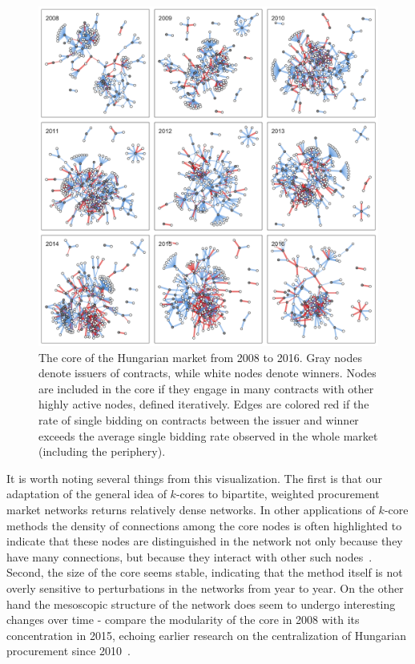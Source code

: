 \begin{figure}
\centering
  \includegraphics[width=\textwidth]{images/ted_networks/hu_core.pdf}
  \caption[Hungarian Market Cores]{The core of the Hungarian market from 2008 to 2016. Gray nodes denote issuers of contracts, while white nodes denote winners. Nodes are included in the core if they engage in many contracts with other highly active nodes, defined iteratively. Edges are colored red if the rate of single bidding on contracts between the issuer and winner exceeds the average single bidding rate observed in the whole market (including the periphery).}
  \label{fig:hu_core}
\end{figure}

It is worth noting several things from this visualization. The first is that our adaptation of the general idea of $k$-cores to bipartite, weighted procurement market networks returns relatively dense networks. In other applications of $k$-core methods the density of connections among the core nodes is often highlighted to indicate that these nodes are distinguished in the network not only because they have many connections, but because they interact with other such nodes~\cite{malliaros2019core}. Second, the size of the core seems stable, indicating that the method itself is not overly sensitive to perturbations in the networks from year to year. On the other hand the mesoscopic structure of the network does seem to undergo interesting changes over time - compare the modularity of the core in 2008 with its concentration in 2015, echoing earlier research on the centralization of Hungarian procurement since 2010~\cite{fazekas2016corruption}. 

